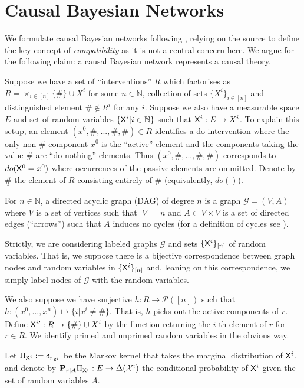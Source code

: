 
\section{Causal Bayesian Networks}

We formulate causal Bayesian networks following \citet{pearl_causality:_2009}, relying on the source to define the key concept of \emph{compatibility} as it is not a central concern here. We argue for the following claim: a causal Bayesian network represents a causal theory. 

Suppose we have a set of ``interventions'' $R$ which factorises as $R=\times_{i\in [n]} \{\#\}\cup X^i$ for some $n\in \mathbb{N}$, collection of sets $\{X^i\}_{i\in [n]}$ and distinguished element $\#\not\in R^i$ for any $i$. Suppose we also have a measurable space $E$ and set of random variables $\{\mathsf{X}^i|i\in \mathbb{N}\}$ such that $\mathsf{X}^i:E\to X^i$. To explain this setup, an element $(x^0,\#,...,\#,\#)\in R$ identifies a do intervention where the only non-$\#$ component $x^0$ is the ``active'' element and the components taking the value $\#$ are ``do-nothing'' elements. Thus $(x^0,\#,...,\#,\#)$ corresponds to $do(\mathsf{X}^0=x^0)$ where occurrences of the passive elements are ommitted. Denote by $\underline{\#}$ the element of $R$ consisting entirely of $\#$ (equivalently, $do()$).

For $n\in \mathbb{N}$, a directed acyclic graph (DAG) of degree $n$ is a graph $\mathcal{G}=(V,A)$ where $V$ is a set of vertices such that $|V|=n$ and $A\subset V\times V$ is a set of directed edges (``arrows'') such that $A$ induces no cycles (for a definition of cycles see \citet{pearl_causality:_2009}). 

Strictly, we are considering labeled graphs $\mathcal{G}$ and sets $\{\mathsf{X}^i\}_{[n]}$ of random variables. That is, we suppose there is a bijective correspondence between graph nodes and random variables in $\{\mathsf{X}^i\}_{[n]}$ and, leaning on this correspondence, we simply label nodes of $\mathcal{G}$ with the random variables.

We also suppose we have surjective $h:R\to \mathscr{P}([n])$ such that $h:(x^0,...,x^n)\mapsto \{i|x^i\neq \#\}$. That is, $h$ picks out the active components of $r$. Define $\mathsf{X}^{i\prime}:R\to \{\#\}\cup X^i$ by the function returning the $i$-th element of $r$ for $r\in R$. We identify primed and unprimed random variables in the obvious way.

Let $\Pi_{\mathsf{X}^i} := \delta_{\pi_{\mathsf{X}^i}}$ be the Markov kernel that takes the marginal distribution of $\mathsf{X}^i$, and denote by $\mathbf{P}_{r|A}\Pi_{\mathsf{X}^i}:E\to \Delta(\mathcal{X}^i)$ the conditional probability of $\mathsf{X}^i$ given the set of random variables $A$.

